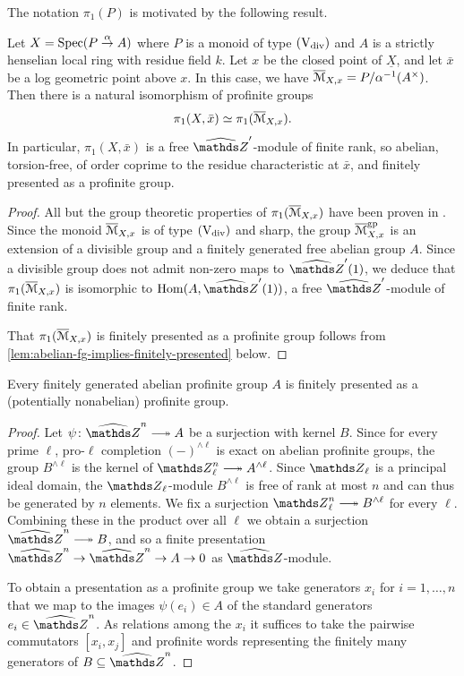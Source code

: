 The notation $\pi_1(P)$ is motivated by the following result.

\begin{prop} \label{prop:FKEt-pi1-local}
    Let $X = \operatorname{Spec}(P\overset{\alpha}{\to} A)$ where $P$ is a monoid of type $(\mathrm{V}_{\rm div})$ and $A$ is a strictly henselian local ring with residue field $k$. Let $x$ be the closed point of $\underline{X}$, and let $\bar{x}$ be a log geometric point above $x$. In this case, we have $\overline{{\mathcal M}}_{X,x} = P/\alpha^{-1}(A^\times)$.  Then there is a natural isomorphism of profinite groups
    \[ 
        \pi_1(X, \bar{x}) \simeq \pi_1(\overline{{\mathcal M}}_{X,x}).
    \]
    In particular, $\pi_1(X, \bar{x})$ is a free $\hZ'$-module of finite rank, so abelian, torsion-free, of order coprime 
    to the residue characteristic at $\bar{x}$, and finitely presented as a profinite group.
\end{prop}
\begin{proof}
All but the group theoretic properties of $\pi_1(\overline{{\mathcal M}}_{X,x})$ have been proven in \cite[Proposition~4.3.1]{AHLS-Log}.
Since the monoid $\overline{{\mathcal M}}_{X,x}$ is of type $(\mathrm{V}_{\rm div})$ and sharp, the group 
$\overline{{\mathcal M}}_{X,x}^{\rm gp}$ is an extension of a divisible group and a finitely generated free abelian group $A$. Since a divisible group does not admit non-zero maps to $\widehat{\bZ}'(1)$, we deduce that
$\pi_1(\overline{{\mathcal M}}_{X,x})$ is isomorphic to $\Hom(A,\hZ'(1))$, a free $\widehat{\bZ}'$-module of finite rank.

That $\pi_1(\overline{{\mathcal M}}_{X,x})$ is finitely presented as a profinite group follows from 
\cref{lem:abelian-fg-implies-finitely-presented} below.
\end{proof}

\begin{lem} \label{lem:abelian-fg-implies-finitely-presented}
    Every finitely generated abelian profinite group $A$ is finitely presented as a (potentially nonabelian) profinite group.
\end{lem}

\begin{proof}
    Let $\psi \colon \hZ^n \surj A$ be a surjection with kernel $B$. Since for every prime $\ell$, pro-$\ell$ completion $(-)^{\wedge \ell}$ is exact on abelian profinite groups, the group $B^{\wedge \ell}$ is the kernel of $\bZ_\ell^n \surj A^{\wedge \ell}$. Since $\bZ_\ell$ is a principal ideal domain, the $\bZ_\ell$-module $B^{\wedge \ell}$ is free of rank at most $n$ and can thus be generated by $n$ elements. We fix a surjection $\bZ_\ell^n \surj B^{\wedge \ell}$ for every $\ell$. Combining these in the product over all $\ell$ we obtain a surjection $\hZ^n \surj B$, and so a finite presentation $\hZ^n \to \hZ^n \to A \to 0$ as $\hZ$-module. 

    To obtain a presentation as a profinite group we take generators $x_i$ for $i=1,\ldots,n$ that we map to the images $\psi(e_i) \in A$ of the standard generators $e_i \in \hZ^n$. As relations among the $x_i$ it suffices to take the pairwise commutators $[x_i,x_j]$ and profinite words representing the finitely many generators of $B \subseteq \hZ^n$. 
\end{proof}

